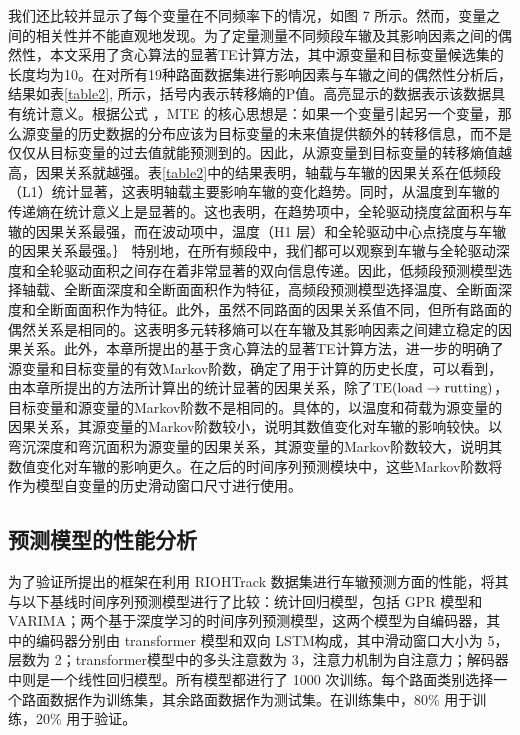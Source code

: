 我们还比较并显示了每个变量在不同频率下的情况，如图 7 所示。然而，变量之间的相关性并不能直观地发现。为了定量测量不同频段车辙及其影响因素之间的偶然性，本文采用了贪心算法的显著TE计算方法，其中源变量和目标变量候选集的长度均为10。在对所有19种路面数据集进行影响因素与车辙之间的偶然性分析后，结果如表\ref{table2}, 所示，括号内表示转移熵的P值。高亮显示的数据表示该数据具有统计意义。根据公式 ，MTE 的核心思想是：如果一个变量引起另一个变量，那么源变量的历史数据的分布应该为目标变量的未来值提供额外的转移信息，而不是仅仅从目标变量的过去值就能预测到的。因此，从源变量到目标变量的转移熵值越高，因果关系就越强。表\ref{table2}中的结果表明，轴载与车辙的因果关系在低频段（L1）统计显著，这表明轴载主要影响车辙的变化趋势。同时，从温度到车辙的传递熵在统计意义上是显著的。这也表明，在趋势项中，全轮驱动挠度盆面积与车辙的因果关系最强，而在波动项中，温度（H1 层）和全轮驱动中心点挠度与车辙的因果关系最强。｝ 特别地，在所有频段中，我们都可以观察到车辙与全轮驱动深度和全轮驱动面积之间存在着非常显著的双向信息传递。因此，低频段预测模型选择轴载、全断面深度和全断面面积作为特征，高频段预测模型选择温度、全断面深度和全断面面积作为特征。此外，虽然不同路面的因果关系值不同，但所有路面的偶然关系是相同的。这表明多元转移熵可以在车辙及其影响因素之间建立稳定的因果关系。此外，本章所提出的基于贪心算法的显著TE计算方法，进一步的明确了源变量和目标变量的有效Markov阶数，确定了用于计算的历史长度，可以看到，由本章所提出的方法所计算出的统计显著的因果关系，除了$\rm{TE}(load \rightarrow rutting)$，目标变量和源变量的Markov阶数不是相同的。具体的，以温度和荷载为源变量的因果关系，其源变量的Markov阶数较小，说明其数值变化对车辙的影响较快。以弯沉深度和弯沉面积为源变量的因果关系，其源变量的Markov阶数较大，说明其数值变化对车辙的影响更久。在之后的时间序列预测模块中，这些Markov阶数将作为模型自变量的历史滑动窗口尺寸进行使用。



\subsection{预测模型的性能分析}

为了验证所提出的框架在利用 RIOHTrack 数据集进行车辙预测方面的性能，将其与以下基线时间序列预测模型进行了比较：统计回归模型，包括 GPR 模型和 VARIMA；两个基于深度学习的时间序列预测模型，这两个模型为自编码器，其中的编码器分别由 transformer 模型和双向 LSTM构成，其中滑动窗口大小为 5，层数为 2；transformer模型中的多头注意数为 3，注意力机制为自注意力；解码器中则是一个线性回归模型。所有模型都进行了 1000 次训练。每个路面类别选择一个路面数据作为训练集，其余路面数据作为测试集。在训练集中，80\% 用于训练，20\% 用于验证。


